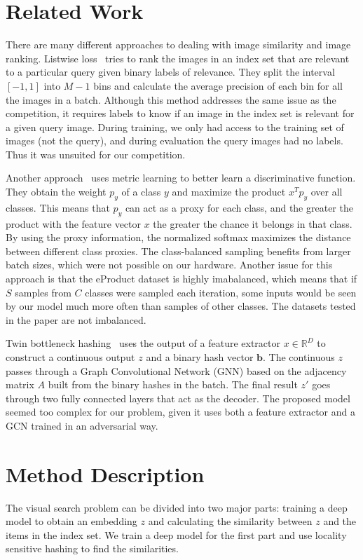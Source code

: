 \documentclass[conference]{IEEEtran}
\begin{document}
\section{Related Work}
\label{sec:related}
There are many different approaches to dealing with image similarity and image 
ranking.
Listwise loss~\cite{revaud2019learning} tries to rank the images in an index set that are 
relevant to a particular query given binary labels of relevance. 
They split the interval $[-1, 1]$ into $M-1$ bins and calculate the average precision
of each bin for all the images in a batch.
Although this method addresses the same issue as the competition, it requires labels to know
if an image in the index set is relevant for a given query image.
During training, we only had access to the training set of images (not the query), and during 
evaluation the query images had no labels.
Thus it was unsuited for our competition.

Another approach~\cite{zhai2018classification} uses metric learning to better learn a discriminative 
function.
They obtain the weight $p_y$ of a class $y$ and maximize the product $x^T p_y$ over all classes.
This means that $p_y$ can act as a proxy for each class, and the greater the product with the feature
vector $x$ the greater the chance it belongs in that class.
By using the proxy information, the normalized softmax maximizes the distance between different class
proxies.
The class-balanced sampling benefits from larger batch sizes, which were not possible on our hardware.
Another issue for this approach is that the eProduct dataset is highly imabalanced, which means that 
if $S$ samples from $C$ classes were sampled each iteration, some inputs would be seen by our model
much more often than samples of other classes.
The datasets tested in the paper are not imbalanced.

Twin bottleneck hashing~\cite{shen2020auto} uses the output of a feature extractor $x\in\mathbb{R}^D$
to construct a continuous output $z$ and a binary hash vector $\boldsymbol{b}$.
The continuous $z$ passes through a Graph Convolutional Network (GNN) based on the adjacency
matrix $A$ built from the binary hashes in the batch.
The final result $z'$ goes through two fully connected layers that act as the decoder.
The proposed model seemed too complex for our problem, given it uses both a feature extractor and a GCN
trained in an adversarial way.

\section{Method Description}
The visual search problem can be divided into two major parts: training a deep model
to obtain an embedding $z$ and calculating the similarity between $z$ and the items in the index set.
We train a deep model for the first part and use locality sensitive hashing to find the 
similarities.
\end{document}
